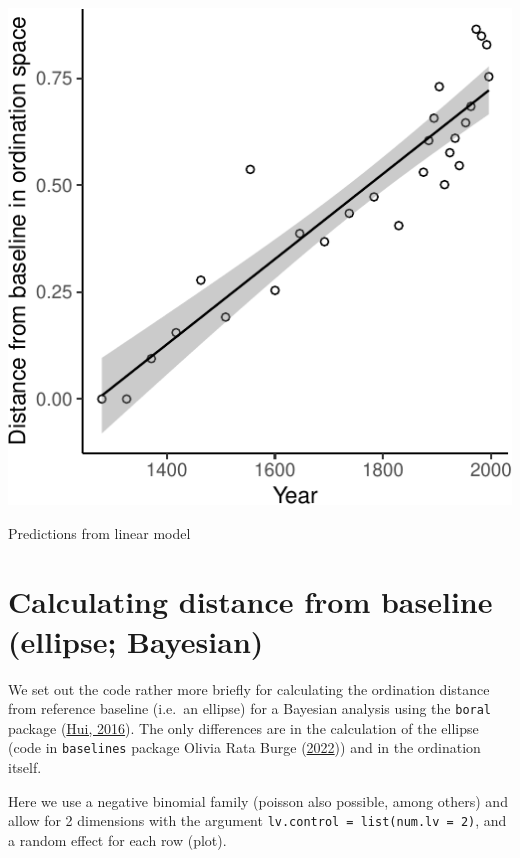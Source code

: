 \documentclass[nofonts,]{tufte-handout}
\begin{document}
\begin{marginfigure}
\includegraphics{Technical-supplement_files/figure-latex/predictinglm-1} \caption[Predictions from linear model]{Predictions from linear model}\label{fig:predictinglm}
\end{marginfigure}

\hypertarget{calculating-distance-from-baseline-ellipse-bayesian}{%
\section{Calculating distance from baseline (ellipse;
Bayesian)}\label{calculating-distance-from-baseline-ellipse-bayesian}}

We set out the code rather more briefly for calculating the ordination
distance from reference baseline (i.e.~an ellipse) for a Bayesian
analysis using the \texttt{boral} package
(\protect\hyperlink{ref-hui16_boral}{Hui, 2016}). The only differences
are in the calculation of the ellipse (code in \texttt{baselines}
package Olivia Rata Burge
(\protect\hyperlink{ref-burge_2022_baselines}{2022})) and in the
ordination itself.

Here we use a negative binomial family (poisson also possible, among
others) and allow for 2 dimensions with the argument
\texttt{lv.control\ =\ list(num.lv\ =\ 2)}, and a random effect for each
row (plot).
\end{document}
